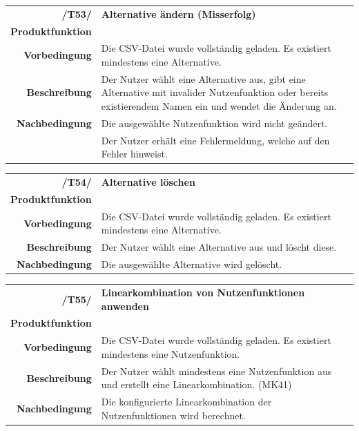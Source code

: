 \documentclass{article}
\begin{document}
\begin{table}[H]
\begin{tabularx}{\textwidth}{rX}
 \vspace{1mm}
\textbf{/T53/}         & \textbf{Alternative ändern (Misserfolg)} \\ \vspace{1mm}
\textbf{Produktfunktion} & \nameref{sec:f:Alternative ändern} \\ \vspace{1mm}
\textbf{Vorbedingung}  & Die CSV-Datei wurde vollständig geladen. Es existiert mindestens eine Alternative.   \\ \vspace{1mm}
\textbf{Beschreibung}  & Der Nutzer wählt eine Alternative aus, gibt eine Alternative mit invalider Nutzenfunktion oder bereits existierendem Namen ein und wendet die Änderung an. \\
\textbf{Nachbedingung} & Die ausgewählte Nutzenfunktion wird nicht geändert. \\ & Der Nutzer erhält eine Fehlermeldung, welche auf den Fehler hinweist.
\end{tabularx}
\end{table}

\begin{table}[H]
\begin{tabularx}{\textwidth}{rX}
 \vspace{1mm}
\textbf{/T54/}         & \textbf{Alternative löschen} \\ \vspace{1mm}
\textbf{Produktfunktion} & \nameref{sec:f:Alternative löschen} \\ \vspace{1mm}
\textbf{Vorbedingung}  & Die CSV-Datei wurde vollständig geladen. Es existiert mindestens eine Alternative.  \\ \vspace{1mm}
\textbf{Beschreibung}  & Der Nutzer wählt eine Alternative aus und löscht diese. \\
\textbf{Nachbedingung} & Die ausgewählte Alternative wird gelöscht.
\end{tabularx}
\end{table}


\begin{table}[H]
\begin{tabularx}{\textwidth}{rX}
\textbf{/T55/}         & \textbf{Linearkombination von Nutzenfunktionen anwenden} \\ \vspace{1mm}
\textbf{Produktfunktion} & \nameref{sec:f:Alternative hinzufügen}\\ \vspace{1mm}
\textbf{Vorbedingung}  & Die CSV-Datei wurde vollständig geladen. Es existiert mindestens eine Nutzenfunktion.  \\
\textbf{Beschreibung}  & Der Nutzer wählt mindestens eine Nutzenfunktion aus und erstellt eine Linearkombination. (MK41) \\
\textbf{Nachbedingung} & Die konfigurierte Linearkombination der Nutzenfunktionen wird berechnet.
\end{tabularx}
\end{table}
\end{document}
